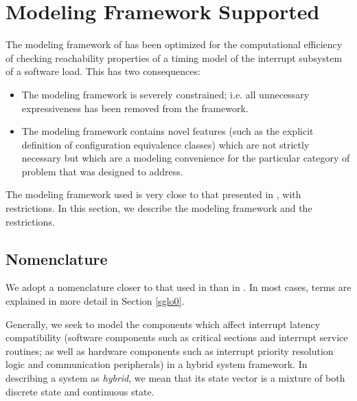 %
\section{Modeling Framework Supported}
\label{smfs0}

The modeling framework of \swname{} has been optimized for the 
computational efficiency of checking reachability properties
of a timing model of the interrupt subsystem of a software load.
This has two consequences:

\begin{itemize}
\item The modeling framework is severely constrained; i.e. all unnecessary
      expressiveness has been removed from the framework.
\item The modeling framework contains novel features (such as 
      the explicit definition of configuration equivalence classes) which are
	  not strictly necessary but which are a modeling convenience for the
	  particular category of problem that \swname{} was designed to address.
\end{itemize}

The modeling framework used is very close to that presented in 
\cite{bib:p:theoryofta:alurdill90}, with restrictions.  In this section,
we describe the modeling framework and the restrictions.


\subsection{Nomenclature}
\label{smfs0:snmc0}

We adopt a nomenclature closer to that used
in \cite{bib:p:hybridsysintlat:lin90} than in \cite{bib:p:theoryofta:alurdill90}.
In most cases, terms are explained in more detail in Section \ref{sglo0}.

Generally, we seek to model the components which affect interrupt latency 
compatibility (software components such as critical sections and interrupt
service routines; as well as hardware components such as interrupt priority
resolution logic and communication peripherals) in a hybrid system framework.
In describing a system as \emph{hybrid}, we mean that its state vector is a mixture
of both discrete state and continuous state.

